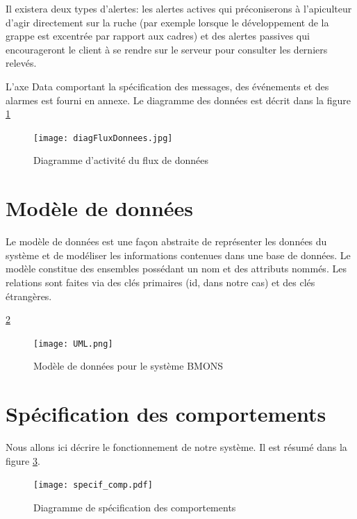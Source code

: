 Il existera deux types d'alertes: les alertes actives qui préconiserons à l'apiculteur d'agir directement sur la ruche (par exemple lorsque le développement de la grappe est excentrée par rapport aux cadres) et des alertes passives qui encourageront le client à se rendre sur le serveur pour consulter les derniers relevés.   

L'axe Data comportant la spécification des messages, des événements et des alarmes est fourni en annexe.
Le diagramme des données est décrit dans la figure \ref{fig:donnees} 



\begin{figure}[h!]
\centering\texttt{[image: diagFluxDonnees.jpg]}
\caption{\label{fig:donnees} Diagramme d'activité du flux de données}
\end{figure}

\clearpage

\section{Modèle de données}
\vspace{1.5cm}
Le modèle de données est une façon abstraite de représenter les données du système et de modéliser les informations contenues dans une base de données. Le modèle constitue des ensembles possédant un nom et des attributs nommés. Les relations sont faites via des clés primaires (id, dans notre cas) et des clés étrangères.  

\ref{fig:UML} 



\begin{figure}[h!]
\centering\texttt{[image: UML.png]}
\caption{\label{fig:UML} Modèle de données pour le système BMONS}
\end{figure}

\clearpage

\section{Spécification des comportements}
\vspace{1.5cm}
Nous allons ici décrire le fonctionnement de notre système. Il est résumé dans la figure \ref{fig:sp_comp}.

\begin{figure}[h!]
\centering\texttt{[image: specif\_comp.pdf]}
\caption{\label{fig:sp_comp} Diagramme de spécification des comportements}
\end{figure}

